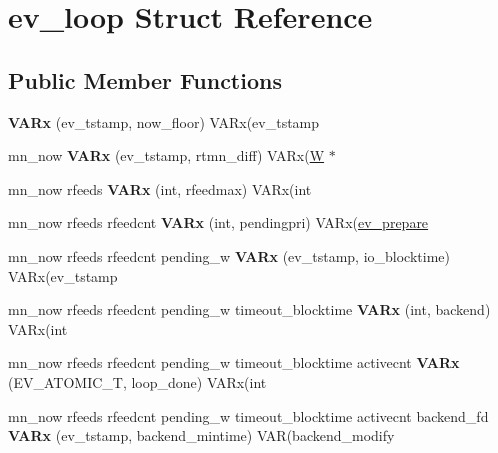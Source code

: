 \hypertarget{structev__loop}{}\section{ev\+\_\+loop Struct Reference}
\label{structev__loop}
\subsection*{Public Member Functions}
\begin{DoxyCompactItemize}
\item 
\hypertarget{structev__loop_af70c9204d60291f61193b3a35d0933fa}{}\label{structev__loop_af70c9204d60291f61193b3a35d0933fa} 
{\bfseries V\+A\+Rx} (ev\+\_\+tstamp, now\+\_\+floor) V\+A\+Rx(ev\+\_\+tstamp
\item 
\hypertarget{structev__loop_ae65ba4dee55622a0c747d1af4fef6688}{}\label{structev__loop_ae65ba4dee55622a0c747d1af4fef6688} 
mn\+\_\+now {\bfseries V\+A\+Rx} (ev\+\_\+tstamp, rtmn\+\_\+diff) V\+A\+Rx(\hyperlink{structev__watcher}{W} $\ast$
\item 
\hypertarget{structev__loop_a0236d9293613ac338e4d9229929ee4c0}{}\label{structev__loop_a0236d9293613ac338e4d9229929ee4c0} 
mn\+\_\+now rfeeds {\bfseries V\+A\+Rx} (int, rfeedmax) V\+A\+Rx(int
\item 
\hypertarget{structev__loop_ab45749dd490b62f5020de7be6d2fe24b}{}\label{structev__loop_ab45749dd490b62f5020de7be6d2fe24b} 
mn\+\_\+now rfeeds rfeedcnt {\bfseries V\+A\+Rx} (int, pendingpri) V\+A\+Rx(\hyperlink{structev__prepare}{ev\+\_\+prepare}
\item 
\hypertarget{structev__loop_a0be1bf5667b27afedb5e8322811e980a}{}\label{structev__loop_a0be1bf5667b27afedb5e8322811e980a} 
mn\+\_\+now rfeeds rfeedcnt pending\+\_\+w {\bfseries V\+A\+Rx} (ev\+\_\+tstamp, io\+\_\+blocktime) V\+A\+Rx(ev\+\_\+tstamp
\item 
\hypertarget{structev__loop_a81f7380917590214e2632eafeb7e562c}{}\label{structev__loop_a81f7380917590214e2632eafeb7e562c} 
mn\+\_\+now rfeeds rfeedcnt pending\+\_\+w timeout\+\_\+blocktime {\bfseries V\+A\+Rx} (int, backend) V\+A\+Rx(int
\item 
\hypertarget{structev__loop_aa56a1452e06b0cfa8d0846000e18a975}{}\label{structev__loop_aa56a1452e06b0cfa8d0846000e18a975} 
mn\+\_\+now rfeeds rfeedcnt pending\+\_\+w timeout\+\_\+blocktime activecnt {\bfseries V\+A\+Rx} (E\+V\+\_\+\+A\+T\+O\+M\+I\+C\+\_\+T, loop\+\_\+done) V\+A\+Rx(int
\item 
\hypertarget{structev__loop_ac2b18e50e559e782902ab4186dc023c4}{}\label{structev__loop_ac2b18e50e559e782902ab4186dc023c4} 
mn\+\_\+now rfeeds rfeedcnt pending\+\_\+w timeout\+\_\+blocktime activecnt backend\+\_\+fd {\bfseries V\+A\+Rx} (ev\+\_\+tstamp, backend\+\_\+mintime) V\+AR(backend\+\_\+modify
\end{DoxyCompactItemize}
